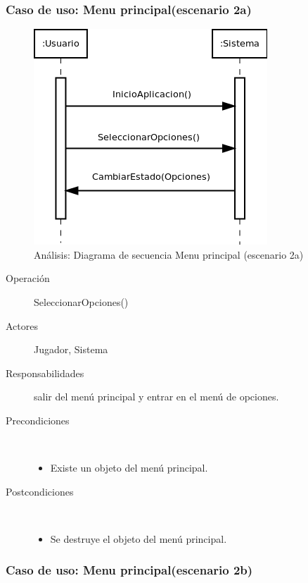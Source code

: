 \subsubsection{Caso de uso: Menu principal(escenario 2a)}

\begin{figure}[H]
  \label{secuencia_menu_principal2}
  \begin{center}
    \includegraphics[scale=0.6]{imagenes/analisis/secuencia_menu_principal2.png}
  \end{center}
  \caption{Análisis: Diagrama de secuencia Menu principal (escenario 2a)}
\end{figure}

\begin{description}
    \item [Operación] SeleccionarOpciones()
    \item [Actores] Jugador, Sistema
    \item [Responsabilidades] salir del menú principal y entrar en el menú de opciones.
    \item [Precondiciones] $\quad$
        \begin{itemize}
            \item Existe un objeto del menú principal.
        \end{itemize}
    \item [Postcondiciones] $\quad$
        \begin{itemize}
            \item Se destruye el objeto del menú principal.
        \end{itemize}
\end{description}

\subsubsection{Caso de uso: Menu principal(escenario 2b)}

